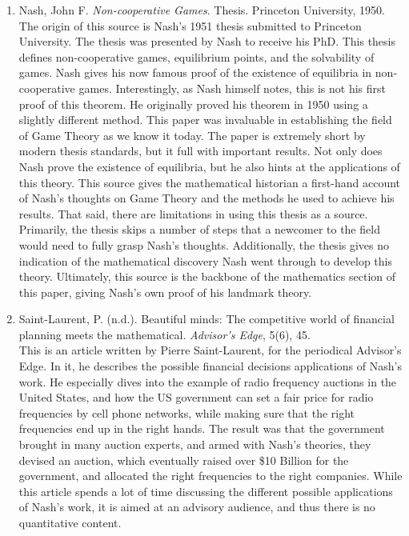 \documentclass[11pt]{article}
\begin{document}
\begin{enumerate}
\item Nash, John F. \textit{Non-cooperative Games}. Thesis. Princeton University, 1950.\\

The origin of this source is Nash’s 1951 thesis submitted to Princeton University. The thesis was presented by Nash to receive his PhD. This thesis defines non-cooperative games, equilibrium points, and the solvability of games. Nash gives his now famous proof of the existence of equilibria in non-cooperative games. Interestingly, as Nash himself notes, this is not his first proof of this theorem. He originally proved his theorem in 1950 using a slightly different method. This paper was invaluable in establishing the field of Game Theory as we know it today. The paper is extremely short by modern thesis standards, but it full with important results. Not only does Nash prove the existence of equilibria, but he also hints at the applications of this theory. This source gives the mathematical historian a first-hand account of Nash’s thoughts on Game Theory and the methods he used to achieve his results. That said, there are limitations in using this thesis as a source. Primarily, the thesis skips a number of steps that a newcomer to the field would need to fully grasp Nash’s thoughts. Additionally, the thesis gives no indication of the mathematical discovery Nash went through to develop this theory. Ultimately, this source is the backbone of the mathematics section of this paper, giving Nash’s own proof of his landmark theory.\\

\item Saint-Laurent, P. (n.d.). Beautiful minds: The competitive world of financial planning meets the mathematical.\textit{ Advisor's Edge}, 5(6), 45.\\

This is an article written by Pierre Saint-Laurent, for the periodical Advisor’s Edge. In it, he describes the possible financial decisions applications of Nash’s work. He especially dives into the example of radio frequency auctions in the United States, and how the US government can set a fair price for radio frequencies by cell phone networks, while making sure that the right frequencies end up in the right hands. The result was that the government brought in many auction experts, and armed with Nash’s theories, they devised an auction, which eventually raised over \$10 Billion for the government, and allocated the right frequencies to the right companies. While this article spends a lot of time discussing the different possible applications of Nash’s work, it is aimed at an advisory audience, and thus there is no quantitative content.\\ 



\end{enumerate}
\end{document}
